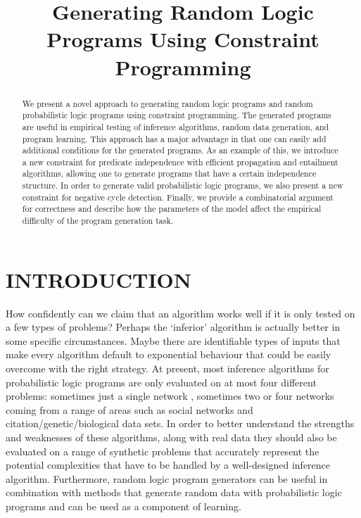 \documentclass[letterpaper]{article}
\title{Generating Random Logic Programs Using Constraint Programming}
\author{}
\theoremstyle{definition}
\begin{document}

\maketitle

\begin{abstract}
  We present a novel approach to generating random logic programs and
  random probabilistic logic programs using constraint programming. The
  generated programs are useful in empirical testing of inference algorithms,
  random data generation, and program learning. This approach has a major
  advantage in that one can easily add additional conditions for the generated
  programs. As an example of this, we introduce a new constraint for predicate
  independence with efficient propagation and entailment algorithms, allowing
  one to generate programs that have a certain independence structure. In order
  to generate valid probabilistic logic programs, we also present a new
  constraint for negative cycle detection. Finally, we provide a combinatorial
  argument for correctness and describe how the parameters of the model affect
  the empirical difficulty of the program generation task.
\end{abstract}

\section{INTRODUCTION}

How confidently can we claim that an algorithm works well if it is only tested
on a few types of problems? Perhaps the `inferior' algorithm is actually
better in some specific circumstances. Maybe there are identifiable
types of inputs that make every algorithm default to exponential behaviour
that could be easily overcome with the right strategy. At present, most
inference algorithms for probabilistic logic programs are only evaluated on at
most four different problems: sometimes just a single network
\citep{DBLP:journals/tplp/KimmigDRCR11,DBLP:journals/corr/abs-1112-3785,DBLP:conf/iclp/KimmigCRDR08},
sometimes two
\citep{DBLP:journals/corr/abs-1009-3798,DBLP:conf/ecai/BruynoogheMKGVJR10} or
four networks \citep{DBLP:conf/ijcai/VlasselaerBKMR15} coming from a range of
areas such as social networks and citation/genetic/biological data sets. In
order to better understand the strengths and weaknesses of these algorithms,
along with real data they should also be evaluated on a range of synthetic
problems that accurately represent the potential complexities that have to be
handled by a well-designed inference algorithm. Furthermore, random logic
program generators can be useful in combination with methods that generate
random data with probabilistic logic programs \citep{DBLP:conf/soict/Dries15}
and can be used as a component of learning.
\end{document}
